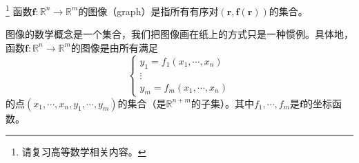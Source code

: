 \documentclass[main.tex]{subfiles}
\begin{document}
\begin{definition}[函数的图像]\footnote{请复习高等数学相关内容\cite[\S 6.4~6.7]{华工高数2009上}。}
函数$\mathbf{f}:\mathbb{R}^n\rightarrow\mathbb{R}^m$的图像（graph）是指所有有序对$\left(\mathbf{r},\mathbf{f}\left(\mathbf{r}\right)\right)$的集合。
\end{definition}

图像的数学概念是一个集合，我们把图像画在纸上的方式只是一种惯例。具体地，函数$\mathbf{f}:\mathbb{R}^n\rightarrow\mathbb{R}^m$的图像是由所有满足
\[
\left\{\begin{array}{c}y_1=f_1\left(x_1,\cdots,x_n\right)\\\vdots\\y_m=f_m\left(x_1,\cdots,x_n\right)\end{array}\right.
\]
的点$\left(x_1,\cdots,x_n,y_1,\cdots,y_m\right)$的集合（是$\mathbb{R}^{n+m}$的子集）。其中$f_1,\cdots,f_m$是$\mathbf{f}$的坐标函数。
\end{document}

